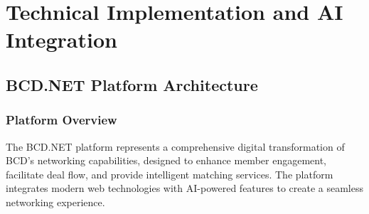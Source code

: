 \chapter{Technical Implementation and AI Integration}

\section{BCD.NET Platform Architecture}

\subsection{Platform Overview}
The BCD.NET platform represents a comprehensive digital transformation of BCD's networking capabilities, designed to enhance member engagement, facilitate deal flow, and provide intelligent matching services. The platform integrates modern web technologies with AI-powered features to create a seamless networking experience.

